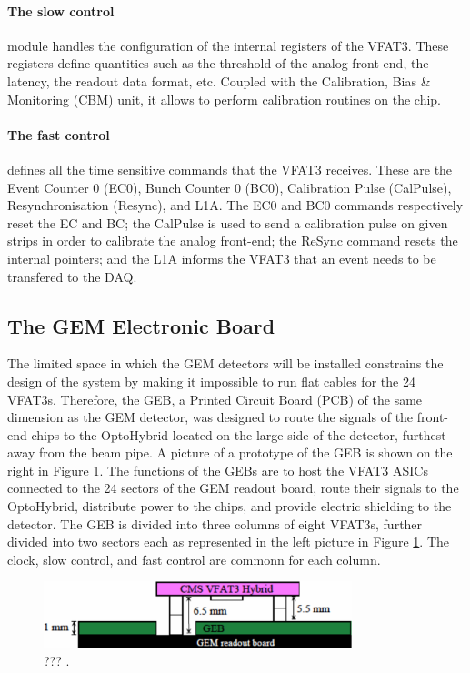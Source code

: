       \paragraph{The slow control} module handles the configuration of the internal registers of the VFAT3. These registers define quantities such as the threshold of the analog front-end, the latency, the readout data format, etc. Coupled with the Calibration, Bias \& Monitoring (CBM) unit, it allows to perform calibration routines on the chip. \\

      \paragraph{The fast control} defines all the time sensitive commands that the VFAT3 receives. These are the Event Counter 0 (EC0), Bunch Counter 0 (BC0), Calibration Pulse (CalPulse), Resynchronisation (Resync), and L1A. The EC0 and BC0 commands respectively reset the EC and BC; the CalPulse is used to send a calibration pulse on given strips in order to calibrate the analog front-end; the ReSync command resets the internal pointers; and the L1A informs the VFAT3 that an event needs to be transfered to the DAQ.

    \subsection{The GEM Electronic Board}

      The limited space in which the GEM detectors will be installed constrains the design of the system by making it impossible to run flat cables for the 24 VFAT3s. Therefore, the GEB, a Printed Circuit Board (PCB) of the same dimension as the GEM detector, was designed to route the signals of the front-end chips to the OptoHybrid located on the large side of the detector, furthest away from the beam pipe. A picture of a prototype of the GEB is shown on the right in Figure \ref{fig:II-2-geb}. The functions of the GEBs are to host the VFAT3 ASICs connected to the 24 sectors of the GEM readout board, route their signals to the OptoHybrid, distribute power to the chips, and provide electric shielding to the detector. The GEB is divided into three columns of eight VFAT3s, further divided into two sectors each as represented in the left picture in Figure \ref{fig:II-2-geb}. The clock, slow control, and fast control are commonn for each column. \\

      \begin{figure}[h!]
        \centering
        \includegraphics[width=0.8\textwidth]{img/II-2-daq/geb.pdf}
        \caption{??? \cite{Colaleo:2021453}.}
        \label{fig:II-2-geb}
      \end{figure}

